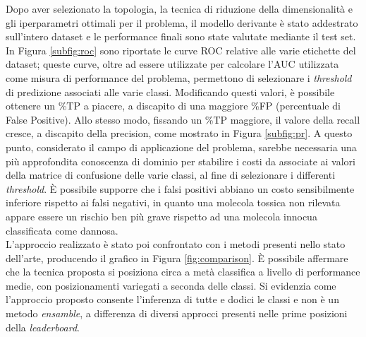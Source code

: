 Dopo aver selezionato la topologia, la tecnica di riduzione della dimensionalità e gli iperparametri ottimali per il problema, il modello derivante è stato addestrato sull'intero dataset e le performance finali sono state valutate mediante il test set.
In Figura \ref{subfig:roc} sono riportate le curve ROC relative alle varie etichette del dataset; queste curve, oltre ad essere utilizzate per calcolare l'AUC utilizzata come misura di performance del problema, permettono di selezionare i \textit{threshold} di predizione associati alle varie classi. 
Modificando questi valori, è possibile ottenere un \%TP a piacere, a discapito di una maggiore \%FP (percentuale di False Positive). 
Allo stesso modo, fissando un \%TP maggiore, il valore della recall cresce, a discapito della precision, come mostrato in Figura \ref{subfig:pr}. 
A questo punto, considerato il campo di applicazione del problema, sarebbe necessaria una più approfondita conoscenza di dominio per stabilire i costi da associate ai valori della matrice di confusione delle varie classi, al fine di selezionare i differenti \textit{threshold}. 
È possibile supporre che i falsi positivi abbiano un costo sensibilmente inferiore rispetto ai falsi negativi, in quanto una molecola tossica non rilevata appare essere un rischio ben più grave rispetto ad una molecola innocua classificata come dannosa.\\
L'approccio realizzato è stato poi confrontato con i metodi presenti nello stato dell'arte, producendo il grafico in Figura \ref{fig:comparison}. È possibile affermare che la tecnica proposta si posiziona circa a metà classifica a livello di performance medie, con posizionamenti variegati a seconda delle classi. Si evidenzia come l'approccio proposto consente l'inferenza di tutte e dodici le classi e non è un metodo \textit{ensamble}, a differenza di diversi approcci presenti nelle prime posizioni della \textit{leaderboard}.

